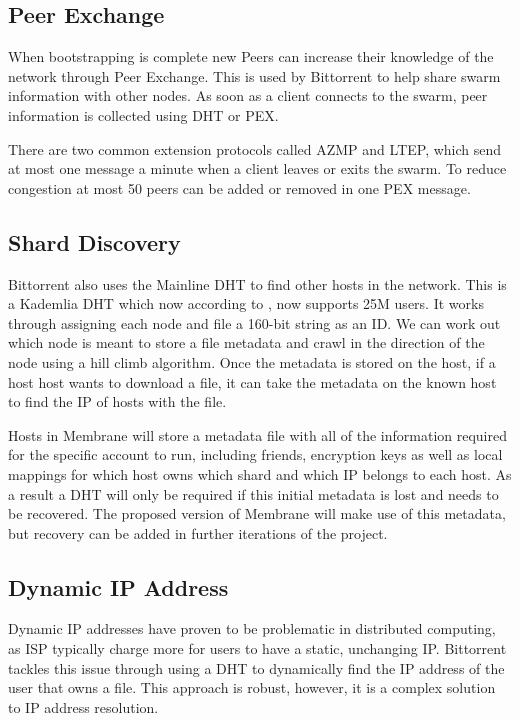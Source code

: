 \documentclass[a4paper, 11pt, twocolumn, twoside]{report}
\begin{document}
\subsection{Peer Exchange}

When bootstrapping is complete new Peers can increase their knowledge of the network through Peer Exchange. This is used by Bittorrent to help share swarm information with other nodes. As soon as a client connects to the swarm, peer information is collected using DHT or PEX.

There are two common extension protocols called AZMP and LTEP, which send at most one message a minute when a client leaves or exits the swarm. To reduce congestion at most 50 peers can be added or removed in one PEX message. \citep{vuze2010vuze}

\subsection{Shard Discovery}

Bittorrent also uses the Mainline DHT to find other hosts in the network. This is a Kademlia DHT which now according to \cite{jones2015mainlinedht}, now supports 25M users. It works through assigning each node and file a 160-bit string as an ID. We can work out which node is meant to store a file metadata and crawl in the direction of the node using a hill climb algorithm. Once the metadata is stored on the host, if a host host wants to download a file, it can take the metadata on the known host to find the IP of hosts with the file.

Hosts in Membrane will store a metadata file with all of the information required for the specific account to run, including friends, encryption keys as well as local mappings for which host owns which shard and which IP belongs to each host. As a result a DHT will only be required if this initial metadata is lost and needs to be recovered. The proposed version of Membrane will make use of this metadata, but recovery can be added in further iterations of the project.

\subsection{Dynamic IP Address}

Dynamic IP addresses have proven to be problematic in distributed computing, as ISP typically charge more for users to have a static, unchanging IP. Bittorrent tackles this issue through using a DHT to dynamically find the IP address of the user that owns a file. This approach is robust, however, it is a complex solution to IP address resolution.
\end{document}
